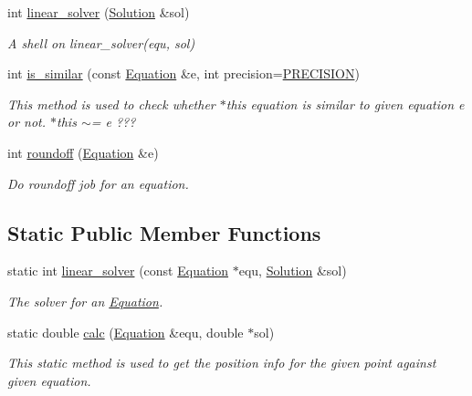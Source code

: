\begin{DoxyCompactItemize}
int \hyperlink{classEquation_a9ce8d3263523f807d35592797e8efd1a}{linear\+\_\+solver} (\hyperlink{classSolution}{Solution} \&sol)
\begin{DoxyCompactList}\small\item\em A shell on linear\+\_\+solver(equ, sol) \end{DoxyCompactList}\item 
int \hyperlink{classEquation_afa602708c6dc480ebdb8d05a7a7d367c}{is\+\_\+similar} (const \hyperlink{classEquation}{Equation} \&e, int precision=\hyperlink{config_8h_a9c7b069fee3c8184e14a7de8e5da2dc6}{P\+R\+E\+C\+I\+S\+I\+ON})
\begin{DoxyCompactList}\small\item\em This method is used to check whether $\ast$this equation is similar to given equation e or not. $\ast$this $\sim$= e ??? \end{DoxyCompactList}\item 
int \hyperlink{classEquation_a337d5e20578e86ac30257622e03b1fe4}{roundoff} (\hyperlink{classEquation}{Equation} \&e)
\begin{DoxyCompactList}\small\item\em Do roundoff job for an equation. \end{DoxyCompactList}\end{DoxyCompactItemize}
\subsection*{Static Public Member Functions}
\begin{DoxyCompactItemize}
\item 
static int \hyperlink{classEquation_a061e5066dffec79ea306546da919ddbf}{linear\+\_\+solver} (const \hyperlink{classEquation}{Equation} $\ast$equ, \hyperlink{classSolution}{Solution} \&sol)
\begin{DoxyCompactList}\small\item\em The solver for an \hyperlink{classEquation}{Equation}. \end{DoxyCompactList}\item 
static double \hyperlink{classEquation_ada446e2cdda9e86007ae08a4c0f6537a}{calc} (\hyperlink{classEquation}{Equation} \&equ, double $\ast$sol)
\begin{DoxyCompactList}\small\item\em This static method is used to get the position info for the given point against given equation. \end{DoxyCompactList}\end{DoxyCompactItemize}
